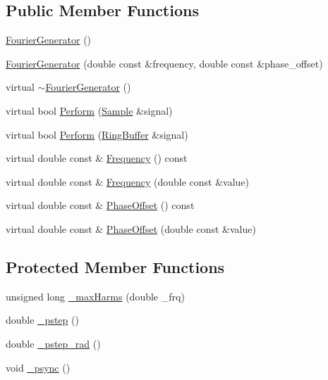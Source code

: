 \subsection*{Public Member Functions}
\begin{DoxyCompactItemize}
\item 
\hyperlink{classSignal_1_1Fourier_1_1FourierGenerator_a9679c0c9255c134291ce2d4773ff7040}{Fourier\+Generator} ()
\item 
\hyperlink{classSignal_1_1Fourier_1_1FourierGenerator_a901bed4cdb21981dc1fb08fcdb7d2497}{Fourier\+Generator} (double const \&frequency, double const \&phase\+\_\+offset)
\item 
virtual \hyperlink{classSignal_1_1Fourier_1_1FourierGenerator_a4a6dbc1bdad8087386aac907e7df481d}{$\sim$\+Fourier\+Generator} ()
\item 
virtual bool \hyperlink{classSignal_1_1Fourier_1_1FourierGenerator_a6ec444e7b66d2cb339c001704071646a}{Perform} (\hyperlink{classSignal_1_1Sample}{Sample} \&signal)
\item 
virtual bool \hyperlink{classSignal_1_1Fourier_1_1FourierGenerator_acc6a3825eb4060269749a37ae29ee847}{Perform} (\hyperlink{classSignal_1_1RingBuffer}{Ring\+Buffer} \&signal)
\item 
virtual double const \& \hyperlink{classSignal_1_1SignalGenerator_a96af42ee68f94e9b04d034fd68b73ecd}{Frequency} () const 
\item 
virtual double const \& \hyperlink{classSignal_1_1SignalGenerator_af83b532bf3ddc3637c2fd7a1dfd095cb}{Frequency} (double const \&value)
\item 
virtual double const \& \hyperlink{classSignal_1_1SignalGenerator_ac2538ec946f001e394d2416fda698d1c}{Phase\+Offset} () const 
\item 
virtual double const \& \hyperlink{classSignal_1_1SignalGenerator_ac6a103ff72beaa338f6d18c812522d78}{Phase\+Offset} (double const \&value)
\end{DoxyCompactItemize}
\subsection*{Protected Member Functions}
\begin{DoxyCompactItemize}
\item 
unsigned long \hyperlink{classSignal_1_1Fourier_1_1FourierGenerator_a99720416bd9ff96636f4acf956a785d5}{\+\_\+max\+Harms} (double \+\_\+frq)
\item 
double \hyperlink{classSignal_1_1SignalGenerator_a43b0eec84ee7df04c947533c0511c2c0}{\+\_\+pstep} ()
\item 
double \hyperlink{classSignal_1_1SignalGenerator_abf2f4ab977c6e84bf85022eab8135304}{\+\_\+pstep\+\_\+rad} ()
\item 
void \hyperlink{classSignal_1_1SignalGenerator_a563f57d4dfd8728a6a572f15c1e2532b}{\+\_\+psync} ()
\end{DoxyCompactItemize}
